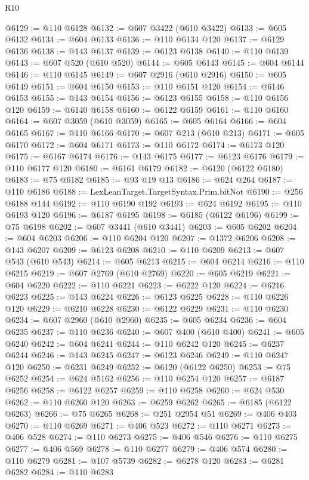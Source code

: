 \begin{lexlean}{R10}
\begin{coremodule}
{{{{{{{{{{{{{{{{{{{{{{{{{{{{{{{{{{{{{{{{{{{{{{{{{{{{{{{{{{{{{{{{{{{{{{{{{{{{{{{{{{{{@6129 := @110 @6128
@6132 := @607 @3422 (@610 @3422)
@6133 := @605 @6132
@6134 := @604 @6133
@6136 := @110 @6134 @120
@6137 := @6129 @6136
@6138 := @143 @6137
@6139 := @6123 @6138
@6140 := @110 @6139
@6143 := @607 @520 (@610 @520)
@6144 := @605 @6143
@6145 := @604 @6144
@6146 := @110 @6145
@6149 := @607 @2916 (@610 @2916)
@6150 := @605 @6149
@6151 := @604 @6150
@6153 := @110 @6151 @120
@6154 := @6146 @6153
@6155 := @143 @6154
@6156 := @6123 @6155
@6158 := @110 @6156 @120
@6159 := @6140 @6158
@6160 := @6122 @6159
@6161 := @110 @6160
@6164 := @607 @3059 (@610 @3059)
@6165 := @605 @6164
@6166 := @604 @6165
@6167 := @110 @6166
@6170 := @607 @213 (@610 @213)
@6171 := @605 @6170
@6172 := @604 @6171
@6173 := @110 @6172
@6174 := @6173 @120
@6175 := @6167 @6174
@6176 := @143 @6175
@6177 := @6123 @6176
@6179 := @110 @6177 @120
@6180 := @6161 @6179
@6182 := @6120 (@6122 @6180)
@6183 := @75 @6182
@6185 := @93 @19 @13
@6186 := @624 @264
@6187 := @110 @6186
@6188 := LexLeanTarget.TargetSyntax.Prim.bitNot
@6190 := @256 @6188 @144
@6192 := @110 @6190 @192
@6193 := @624 @6192
@6195 := @110 @6193 @120
@6196 := @6187 @6195
@6198 := @6185 (@6122 @6196)
@6199 := @75 @6198
@6202 := @607 @3441 (@610 @3441)
@6203 := @605 @6202
@6204 := @604 @6203
@6206 := @110 @6204 @120
@6207 := @1372 @6206
@6208 := @143 @6207
@6209 := @6123 @6208
@6210 := @110 @6209
@6213 := @607 @543 (@610 @543)
@6214 := @605 @6213
@6215 := @604 @6214
@6216 := @110 @6215
@6219 := @607 @2769 (@610 @2769)
@6220 := @605 @6219
@6221 := @604 @6220
@6222 := @110 @6221
@6223 := @6222 @120
@6224 := @6216 @6223
@6225 := @143 @6224
@6226 := @6123 @6225
@6228 := @110 @6226 @120
@6229 := @6210 @6228
@6230 := @6122 @6229
@6231 := @110 @6230
@6234 := @607 @2960 (@610 @2960)
@6235 := @605 @6234
@6236 := @604 @6235
@6237 := @110 @6236
@6240 := @607 @400 (@610 @400)
@6241 := @605 @6240
@6242 := @604 @6241
@6244 := @110 @6242 @120
@6245 := @6237 @6244
@6246 := @143 @6245
@6247 := @6123 @6246
@6249 := @110 @6247 @120
@6250 := @6231 @6249
@6252 := @6120 (@6122 @6250)
@6253 := @75 @6252
@6254 := @624 @5162
@6256 := @110 @6254 @120
@6257 := @6187 @6256
@6258 := @6122 @6257
@6259 := @110 @6258
@6260 := @624 @530
@6262 := @110 @6260 @120
@6263 := @6259 @6262
@6265 := @6185 (@6122 @6263)
@6266 := @75 @6265
@6268 := @251 @2954 @51
@6269 := @406 @403
@6270 := @110 @6269
@6271 := @406 @523
@6272 := @110 @6271
@6273 := @406 @528
@6274 := @110 @6273
@6275 := @406 @546
@6276 := @110 @6275
@6277 := @406 @569
@6278 := @110 @6277
@6279 := @406 @574
@6280 := @110 @6279
@6281 := @107 @5739
@6282 := @6278 @120
@6283 := @6281 @6282
@6284 := @110 @6283
}}}}}}}}}}}}}}}}}}}}}}}}}}}}}}}}}}}}}}}}}}}}}}}}}}}}}}}}}}}}}}}}}}}}}}}}}}}}}}}}}}}}
\end{coremodule}
\end{lexlean}
